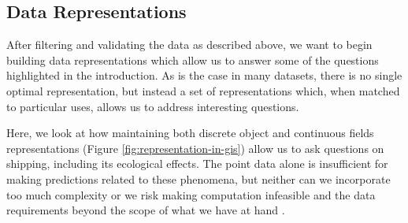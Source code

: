 

\subsection{Data Representations}


After filtering and validating the data as described above, we want to begin building data representations which allow us to answer some of the questions highlighted in the introduction. As is the case in many datasets, there is no single optimal representation, but instead a set of representations which, when matched to particular uses, allows us to address interesting questions.

Here, we look at how maintaining both discrete object and continuous fields representations (Figure \ref{fig:representation-in-gis}) allow us to ask questions on shipping, including its ecological effects. The point data alone is insufficient for making predictions related to these phenomena, but neither can we incorporate too much complexity or we risk making computation infeasible and the data requirements beyond the scope of what we have at hand \citep{de2007geospatial}.




